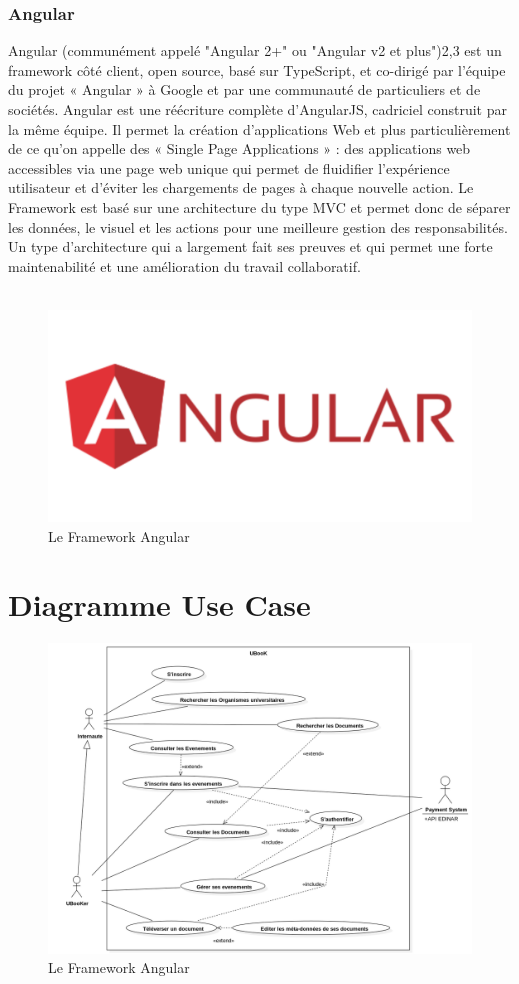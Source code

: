 \documentclass[12pt]{report}
\begin{document}
\subsubsection{Angular}
Angular (communément appelé "Angular 2+" ou "Angular v2 et plus")2,3 est un framework côté client, open source, basé sur TypeScript, et co-dirigé par l'équipe du projet « Angular » à Google et par une communauté de particuliers et de sociétés. Angular est une réécriture complète d'AngularJS, cadriciel construit par la même équipe. Il permet la création d’applications Web et plus particulièrement de ce qu’on appelle des « Single Page Applications » : des applications web accessibles via une page web unique qui permet de fluidifier l’expérience utilisateur et d’éviter les chargements de pages à chaque nouvelle action. Le Framework est basé sur une architecture du type MVC et permet donc de séparer les données, le visuel et les actions pour une meilleure gestion des responsabilités. Un type d’architecture qui a largement fait ses preuves et qui permet une forte maintenabilité et une amélioration du travail collaboratif.\\ \\
\begin{figure}[h]
    \centering
    \includegraphics[width=.5\textwidth]{angular}
    \caption{Le Framework Angular}
    \label{fig:mesh6}
\end{figure}
\newpage
\section{Diagramme Use Case}

\begin{figure}[h]
    \centering
    \includegraphics[width=1\textwidth]{useCase}
    \caption{Le Framework Angular}
    \label{fig:mesh6}
\end{figure}
\end{document}
